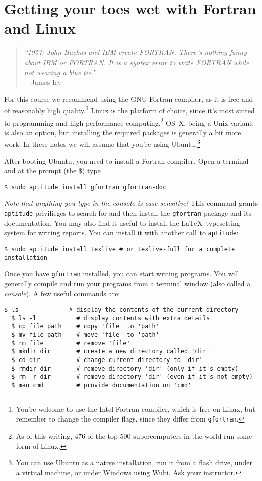 \chapter{Getting your toes wet with Fortran and Linux}
\label{chap:Getting your toes wet}
\begin{quote}\small
  \emph{``1957: John Backus and IBM create FORTRAN. There's nothing funny about IBM or FORTRAN. It is a syntax error to write FORTRAN while not wearing a blue tie.''} \\ \hspace*{\fill}---James Iry
\end{quote}

For this course we recommend using the GNU Fortran compiler, as it is free and of reasonably high quality.\footnote{You're welcome to use the Intel Fortran compiler, which is free on Linux, but remember to change the compiler flags, since they differ from \texttt{gfortran}.}
Linux is the platform of choice, since it's most suited to programming and high-performance computing.\footnote{As of this writing, 476 of the top 500 supercomputers in the world run some form of Linux.}
OS~X, being a Unix variant, is also an option, but installing the required packages is generally a bit more work.
In these notes we will assume that you're using Ubuntu.\footnote{You can use Ubuntu as a native installation, run it from a flash drive, under a virtual machine, or under Windows using Wubi.
Ask your instructor.}

After booting Ubuntu, you need to install a Fortran compiler.
Open a terminal and at the prompt (the \$) type
\begin{lstlisting}[style=prompt, nolol]
  $ sudo aptitude install gfortran gfortran-doc
\end{lstlisting}
\emph{Note that anything you type in the console is case-sensitive!}
This command grants \texttt{aptitude} privilieges to search for and then install the \texttt{gfortran} package and its documentation.
You may also find it useful to install the \LaTeX\ typesetting system for writing reports.
You can install it with another call to \texttt{aptitude}:
\begin{lstlisting}[style=prompt, nolol]
  $ sudo aptitude install texlive # or texlive-full for a complete installation
\end{lstlisting}

Once you have \texttt{gfortran} installed, you can start writing programs.
You will generally compile and run your programs from a terminal window (also called a \emph{console}).
A few useful commands are:
\begin{lstlisting}[style=prompt, nolol]
  $ ls              # display the contents of the current directory
  $ ls -l           # display contents with extra details
  $ cp file path    # copy 'file' to 'path'
  $ mv file path    # move 'file' to 'path'
  $ rm file         # remove 'file'
  $ mkdir dir       # create a new directory called 'dir'
  $ cd dir          # change current directory to 'dir'
  $ rmdir dir       # remove directory 'dir' (only if it's empty)
  $ rm -r dir       # remove directory 'dir' (even if it's not empty)
  $ man cmd         # provide documentation on 'cmd'
\end{lstlisting}

